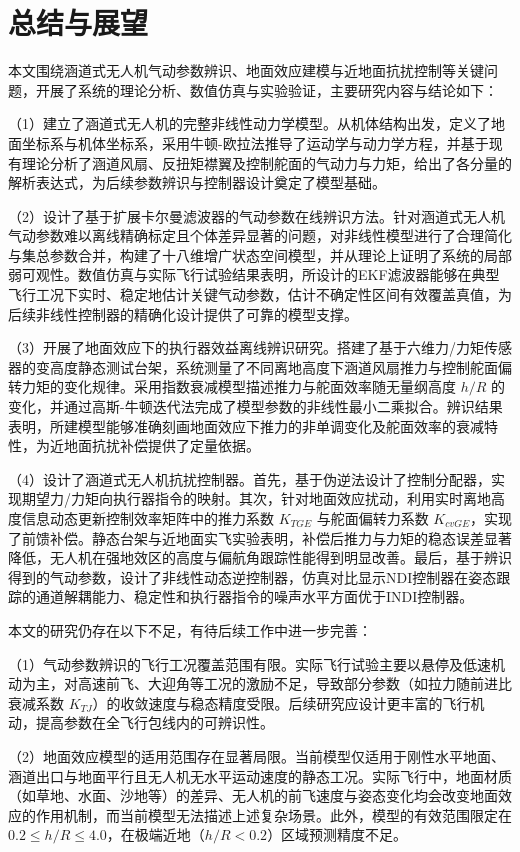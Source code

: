 \chapter{总结与展望}

本文围绕涵道式无人机气动参数辨识、地面效应建模与近地面抗扰控制等关键问题，开展了系统的理论分析、数值仿真与实验验证，主要研究内容与结论如下：

（1）建立了涵道式无人机的完整非线性动力学模型。从机体结构出发，定义了地面坐标系与机体坐标系，采用牛顿-欧拉法推导了运动学与动力学方程，并基于现有理论分析了涵道风扇、反扭矩襟翼及控制舵面的气动力与力矩，给出了各分量的解析表达式，为后续参数辨识与控制器设计奠定了模型基础。

（2）设计了基于扩展卡尔曼滤波器的气动参数在线辨识方法。针对涵道式无人机气动参数难以离线精确标定且个体差异显著的问题，对非线性模型进行了合理简化与集总参数合并，构建了十八维增广状态空间模型，并从理论上证明了系统的局部弱可观性。数值仿真与实际飞行试验结果表明，所设计的EKF滤波器能够在典型飞行工况下实时、稳定地估计关键气动参数，估计不确定性区间有效覆盖真值，为后续非线性控制器的精确化设计提供了可靠的模型支撑。

（3）开展了地面效应下的执行器效益离线辨识研究。搭建了基于六维力/力矩传感器的变高度静态测试台架，系统测量了不同离地高度下涵道风扇推力与控制舵面偏转力矩的变化规律。采用指数衰减模型描述推力与舵面效率随无量纲高度 \(h/R\) 的变化，并通过高斯-牛顿迭代法完成了模型参数的非线性最小二乘拟合。辨识结果表明，所建模型能够准确刻画地面效应下推力的非单调变化及舵面效率的衰减特性，为近地面抗扰补偿提供了定量依据。

（4）设计了涵道式无人机抗扰控制器。首先，基于伪逆法设计了控制分配器，实现期望力/力矩向执行器指令的映射。其次，针对地面效应扰动，利用实时离地高度信息动态更新控制效率矩阵中的推力系数 \(K_{TGE}\) 与舵面偏转力系数 \(K_{cvGE}\)，实现了前馈补偿。静态台架与近地面实飞实验表明，补偿后推力与力矩的稳态误差显著降低，无人机在强地效区的高度与偏航角跟踪性能得到明显改善。最后，基于辨识得到的气动参数，设计了非线性动态逆控制器，仿真对比显示NDI控制器在姿态跟踪的通道解耦能力、稳定性和执行器指令的噪声水平方面优于INDI控制器。

本文的研究仍存在以下不足，有待后续工作中进一步完善：

（1）气动参数辨识的飞行工况覆盖范围有限。实际飞行试验主要以悬停及低速机动为主，对高速前飞、大迎角等工况的激励不足，导致部分参数（如拉力随前进比衰减系数 \(K_{TJ}\)）的收敛速度与稳态精度受限。后续研究应设计更丰富的飞行机动，提高参数在全飞行包线内的可辨识性。

（2）地面效应模型的适用范围存在显著局限。当前模型仅适用于刚性水平地面、涵道出口与地面平行且无人机无水平运动速度的静态工况。实际飞行中，地面材质（如草地、水面、沙地等）的差异、无人机的前飞速度与姿态变化均会改变地面效应的作用机制，而当前模型无法描述上述复杂场景。此外，模型的有效范围限定在 \(0.2 \leq h/R \leq 4.0\)，在极端近地（\(h/R < 0.2\)）区域预测精度不足。

